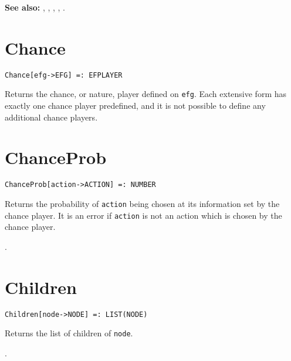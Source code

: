 \vspace{12pt} \noindent
\textbf{See also:}
,
,
,
,
.


\section*{Chance}\label{PrimChance}
\begin{verbatim}
Chance[efg->EFG] =: EFPLAYER 
\end{verbatim}

\noindent
Returns the chance, or nature, player defined on \verb+efg+.  Each
extensive form has exactly one chance player predefined, and it is not
possible to define any additional chance players. 


\section*{ChanceProb}\label{PrimChanceProb}
\begin{verbatim}
ChanceProb[action->ACTION] =: NUMBER 
\end{verbatim}

\noindent
Returns the probability of \verb+action+ being chosen at its information
set by the chance player.  It is an error if \verb+action+ is not an action
which is chosen by the chance player.

\seealso {}.


\section*{Children}\label{PrimChildren}
\begin{verbatim} 
Children[node->NODE] =: LIST(NODE) 
\end{verbatim}

\noindent
Returns the list of children of \verb+node+.

\seealso {}.


